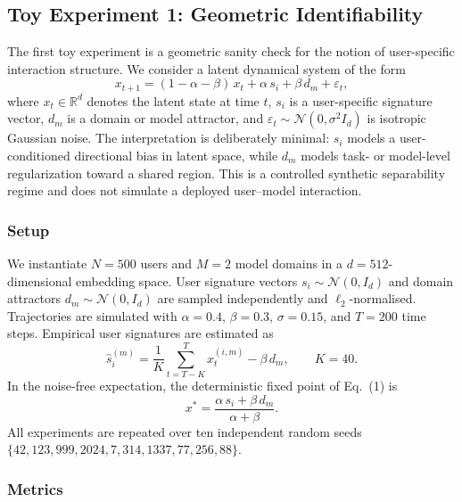 \documentclass[11pt]{article}
\begin{document}
\subsection{Toy Experiment 1: Geometric Identifiability}

The first toy experiment is a geometric sanity check for the notion of
user-specific interaction structure. We consider a latent dynamical system of the
form
\begin{equation}
  x_{t+1} = (1 - \alpha - \beta)\, x_t + \alpha\, s_i + \beta\, d_m + \varepsilon_t,
\end{equation}
where $x_t \in \mathbb{R}^d$ denotes the latent state at time $t$, $s_i$ is a
user-specific signature vector, $d_m$ is a domain or model attractor, and
$\varepsilon_t \sim \mathcal{N}(0, \sigma^2 I_d)$ is isotropic Gaussian noise. The
interpretation is deliberately minimal: $s_i$ models a user-conditioned directional
bias in latent space, while $d_m$ models task- or model-level regularization toward
a shared region. This is a controlled synthetic separability regime and does not
simulate a deployed user--model interaction.

\subsubsection{Setup}

We instantiate $N=500$ users and $M=2$ model domains in a $d=512$-dimensional
embedding space. User signature vectors $s_i \sim \mathcal{N}(0, I_d)$ and domain
attractors $d_m \sim \mathcal{N}(0, I_d)$ are sampled independently and
$\ell_2$-normalised. Trajectories are simulated with $\alpha=0.4$, $\beta=0.3$,
$\sigma=0.15$, and $T=200$ time steps. Empirical user signatures are estimated as
\begin{equation}
  \hat{s}^{(m)}_i = \frac{1}{K} \sum_{t=T-K}^{T} x^{(i,m)}_t - \beta\, d_m,
  \qquad K=40.
\end{equation}
In the noise-free expectation, the deterministic fixed point of Eq.~(1) is
\begin{equation}
  x^{*} = \frac{\alpha\, s_i + \beta\, d_m}{\alpha + \beta}.
\end{equation}
All experiments are repeated over ten independent random seeds
$\{42, 123, 999, 2024, 7, 314, 1337, 77, 256, 88\}$.

\subsubsection{Metrics}
\end{document}
